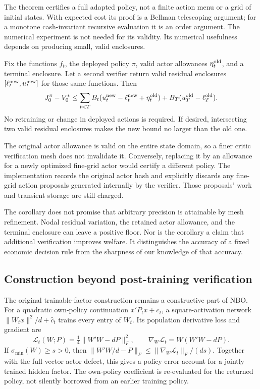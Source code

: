 \documentclass[ecta,nameyear,draft]{econsocart}
\begin{document}
The theorem certifies a full adapted policy, not a finite action menu or a grid of initial states. With expected cost its proof is a Bellman telescoping argument; for a monotone cash-invariant recursive evaluation it is an order argument. The numerical experiment is not needed for its validity. Its numerical usefulness depends on producing small, valid enclosures.

\begin{corollary}\label{cor:retain}
Fix the functions $f_t$, the deployed policy $\pi$, valid actor allowances $\eta_t^{\rm old}$, and a terminal enclosure. Let a second verifier return valid residual enclosures $[\ell_t^{\rm new},u_t^{\rm new}]$ for those same functions. Then
\begin{equation}\label{eq:retained}
 J_0^\pi-V_0^*\leq
 \sum_{t<T}B_t(u_t^{\rm new}-\ell_t^{\rm new}+\eta_t^{\rm old})
          +B_T(u_T^{\rm old}-\ell_T^{\rm old}).
\end{equation}
No retraining or change in deployed actions is required. If desired, intersecting two valid residual enclosures makes the new bound no larger than the old one.
\end{corollary}

The original actor allowance is valid on the entire state domain, so a finer critic verification mesh does not invalidate it. Conversely, replacing it by an allowance for a newly optimized fine-grid actor would certify a different policy. The implementation records the original actor hash and explicitly discards any fine-grid action proposals generated internally by the verifier. Those proposals' work and transient storage are still charged.

The corollary does not promise that arbitrary precision is attainable by mesh refinement. Nodal residual variation, the retained actor allowance, and the terminal enclosure can leave a positive floor. Nor is the corollary a claim that additional verification improves welfare. It distinguishes the accuracy of a fixed economic decision rule from the sharpness of our knowledge of that accuracy.

\subsection{Construction beyond post-training verification}
The original trainable-factor construction remains a constructive part of NBO. For a quadratic own-policy continuation $x'P_tx+c_t$, a square-activation network $\|W_tx\|^2/d+\widehat c_t$ trains every entry of $W_t$. Its population derivative loss and gradient are
\[
 \mathcal L_t(W;P)=\tfrac14\|W'W-dP\|_F^2,
 \qquad \nabla_W\mathcal L_t=W(W'W-dP).
\]
If $\sigma_{\min}(W)\geq s>0$, then
$\|W'W/d-P\|_F\leq\|\nabla_W\mathcal L_t\|_F/(ds)$.
Together with the full-vector actor defect, this gives a policy-error account for a jointly trained hidden factor. The own-policy coefficient is re-evaluated for the returned policy, not silently borrowed from an earlier training policy.
\end{document}
